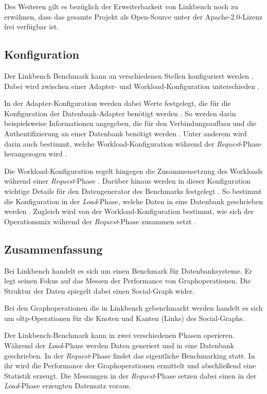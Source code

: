 Des Weiteren gilt es bezüglich der Erweiterbarkeit von Linkbench noch zu erwähnen, dass das gesamte Projekt als Open-Source unter der Apache-2.0-Lizenz frei verfügbar ist.

\subsection{Konfiguration}
Der Linkbench Benchmark kann an verschiedenen Stellen konfiguriert werden \cite{linkbench_paper,fb_linkbench_github}. Dabei wird zwischen einer Adapter- und Workload-Konfiguration unterschieden \cite{fb_linkbench_github}. 

In der Adapter-Konfiguration werden dabei Werte festgelegt, die für die Konfiguration der Datenbank-Adapter benötigt werden \cite{fb_linkbench_github}. So werden darin beispielsweise Informationen angegeben, die für den Verbindungsaufbau und die Authentifizierung an einer Datenbank benötigt werden \cite{fb_linkbench_github}. Unter anderem wird darin auch bestimmt, welche Workload-Konfiguration während der \textit{Request}-Phase herangezogen wird \cite{fb_linkbench_github}. 

Die Workload-Konfiguration regelt hingegen die Zusammensetzung des Workloads während einer \textit{Request}-Phase \cite{fb_linkbench_github}. Darüber hinaus werden in dieser Konfiguration wichtige Details für den Datengenerator des Benchmarks festgelegt \cite{fb_linkbench_github}. So bestimmt die Konfiguration in der \textit{Load}-Phase, welche Daten in eine Datenbank geschrieben werden \cite{fb_linkbench_github}. Zugleich wird von der Workload-Konfiguration bestimmt, wie sich der Operationsmix während der \textit{Request}-Phase zusammen setzt \cite{fb_linkbench_github}.

\subsection{Zusammenfassung}
Bei Linkbench handelt es sich um einen Benchmark für Datenbanksysteme. Er legt seinen Fokus auf das Messen der Performance von Graphoperationen. Die Struktur der Daten spiegelt dabei einen Social-Graph wider. 

Bei den Graphoperationen die in Linkbench gebenchmarkt werden handelt es sich um \acs{oltp}-Operationen für die Knoten und Kanten (Links) des Social-Graphs.

Der Linkbench-Benchmark kann in zwei verschiedenen Phasen operieren. Während der \textit{Load}-Phase werden Daten generiert und in eine Datenbank geschrieben. In der \textit{Request}-Phase findet das eigentliche Benchmarking statt. In ihr wird die Performance der Graphoperationen ermittelt und abschließend eine Statistik erzeugt. Die Messungen in der \textit{Request}-Phase setzen dabei einen in der \textit{Load}-Phase erzeugten Datensatz voraus. 


